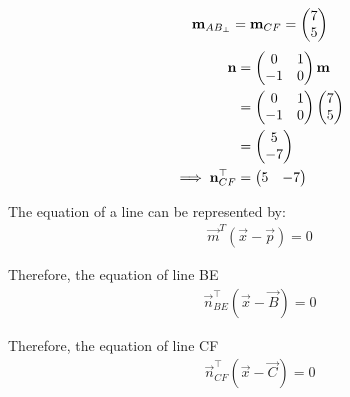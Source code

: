 \documentclass[12pt]{article}
\begin{document}
\begin{align}
\mathbf{m}_{AB_{\perp}}=\mathbf{m}_{CF}=\begin{pmatrix}7\\5\end{pmatrix}
\end{align}
\begin{align}
\mathbf{n} &= \begin{pmatrix}0&1 \\ -1&0\end{pmatrix}\mathbf{m}\\
&= \begin{pmatrix}0&1 \\ -1&0\end{pmatrix}\begin{pmatrix}7 \\ 5\end{pmatrix}\\
&= \begin{pmatrix}5 \\ -7\end{pmatrix}\\
\implies \mathbf{n}_{CF}^{\top} &= \begin{pmatrix}5&-7\end{pmatrix}
\end{align}


The equation of a line can be represented by:
\begin{align}
\vec{m}^{T}(\vec{x}-\vec{p})=0
\end{align}

Therefore, the equation of line BE
\begin{align}
\vec{n}_{BE}^{\top}(\vec{x}-\vec{B})=0
\end{align}

Therefore, the equation of line CF
\begin{align}
\vec{n}_{CF}^{\top}(\vec{x}-\vec{C})=0
\end{align}
\end{document}

